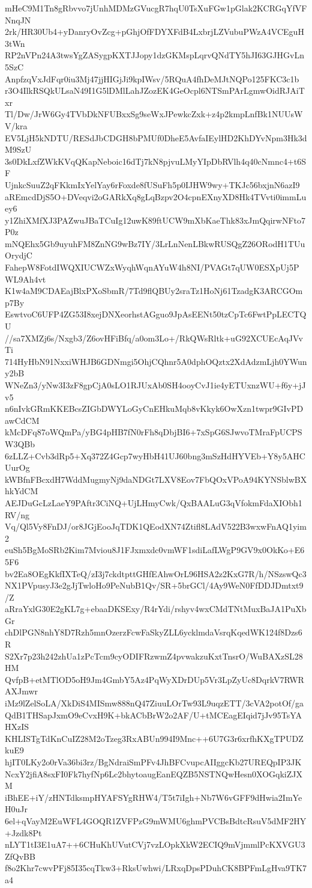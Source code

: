 mHeC9M1Tn8gRbvvo7jUnhMDMzGVucgR7hqU0TsXuFGw1pGlak2KCRGqYfVFNnqJN
2rk/HR30Ub4+yDanryOvZcg+pGhjOfFDYXFdB4LxbrjLZVubuPWzA4VCEguH3tWn
RP2nVPn24A3twsYgZASygpKXTJJopy1dzGKMspLqrvQNdTY5hJI63GJHGvLn5SzC
AnpfzqVxJdFqr0iu3Mj47jjHIGjJi9kpIWsv/5RQuA4fhDeMJtNQPo125FKC3c1b
r3O4IlkRSQkULsaN49I1G5lDMlLahJZozEK4GeOcpl6NTSmPArLgmwOidRJAiTxr
Tl/Dw/JrW6Gy4TVbDkNFUBxxSg9seWxJPewkcZxk+z4p2kmpLnfBk1NUUsWV/kra
EV5LjH5kNDTU/RESdJbCDGH8bPMUf0DheE5AvfaIEylHD2KhDYvNpm3Hk3dM9SzU
3s0DkLxfZWkKVqQKapNeboic16dTj7kN8pjvuLMyYIpDbRVlh4q40cNmnc4+t6SF
UjnkcSuuZ2qFKkmIxYelYay6rFoxde8fUSuFh5p0IJHW9wy+TKJc56bxjnN6azI9
aREmcdDjS5O+DVeqvi2oGARkXq8gLqBzpv2O4cpnEXnyXD8Hk4TVvti0immLuey6
y1ZhiXMfXJ3PAZwuJBaTCuIg12uwK89ftUCW9mXbKaeThk83xJmQqirwNFto7P0z
mNQEhx5Gb9uyuhFM8ZnNG9wBz7IY/3LrLnNenLBkwRUSQgZ26ORodH1TUuOrydjC
FahepW8FotdIWQXIUCWZxWyqhWqnAYuW4h8NI/PVAGt7qUW0ESXpUj5PWL9Ah4vt
K1w4aM9CDAEajBlxPXoSbmR/7Td9flQBUy2sraTz1HoNj61TzadgK3ARCGOmp7By
EswtvoC6UFP4ZG53I8xejDNXeorhstAGguo9JpAsEENt50tzCpTc6FwtPpLECTQU
//sa7XMZj6s/Nxgb3/Z6ovHFiBfq/a0om3Lo+/RkQWsRltk+uG92XCUEcAqJVvTi
714HyHbN91NxxiWHJB6GDNmgi5OhjCQhnr5A0dphOQztx2XdAdzmLjh0YWuny2bB
WNeZn3/yNw3I3zF8gpCjA0sLO1RJUxAb0SH4ooyCvJ1ie4yETUxnzWU+f6y+jJv5
n6nIvkGRmKKEBcsZIGbDWYLoGyCnEHkuMqb8vKkyk6OwXzn1twpr9GIvPDawCdCM
kMcDFq87oWQmPa/yBG4pHB7fN0rFh8qDbjBI6+7xSpG6SJwvoTMraFpUCPSW3QBb
6zLLZ+Cvb3dRp5+Xq372Z4Gcp7wyHbH41UJ60bng3mSzHdHYVEb+Y8y5AHCUurOg
kWBfnFBcxdH7WddMugmyNj9daNDGt7LXV8Eov7FbQOxVPoA94KYNSblwBXhkYdCM
AEJDuGcLzLaeY9PAftr3CiNQ+UjLHmyCwk/QxBAALuG3qVfokmFdaXIObh1RV/ng
Vq/Ql5Vy8FnDJ/or8JGjEooJqTDK1QEodXN74Ztifl8LAdV522B3wxwFnAQ1yim2
euSh5BgMoSRb2Kim7Mviou8J1FJxmxdc0vmWF1sdiLafLWgP9GV9x0OkKo+E65F6
bv2Ea8OEgKkfIXTeQ/zI3j7ckdtpttGHfEAhwOrL96HSA2z2KxG7R/h/NSzswQc3
NX1PVpusyJ3e2gJjTwloHo9PeNubB1Qv/SR+5brGCl/4Ay9WeN0FfDDJDmtxt9/Z
aRraYxlG30E2gKL7g+ebaaDKSExy/R4rYdi/rshyv4wxCMdTNtMuxBaJA1PuXbGr
chDlPGN8nhY8D7Rzh5mnOzerzFcwFaSkyZLL6ycklmdaVsrqKqedWK124f8Dzs6R
S2Xr7p23h242zhUa1zPcTcm9cyODIFRzwmZ4pvwakzuKxtTnsrO/WuBAXzSL28HM
QvfpB+etMTlOD5oH9Jm4GmbY5Az4PqWyXDrDUp5Vr3LpZyUc8DqrkV7RWRAXJmwr
iMz9lZelSoLA/XkDiS4MISmw888nQ47ZiuuLOrTw93L9uqzETT/3cVA2potOf/ga
QdB1THSapJxmO9eCvxH9K+bkACbBrW2o2AF/U+tMCEagEIqid7jJv95TsYAHXzIS
KHLISTgTdKnCuIZ28M2oTzeg3RxABUn994I9Mnc++6U7G3r6xrfhKXgTPUDZkuE9
hjIT0LKy2o0rVa36bi3rz/BgNdraiSmPFv4JhBFCvupcAIIggcKb27UREQpIP3JK
NcxY2jfiA8sxFI0Fk7hyfNp6Lc2bhytoaugEanEQZB5NSTNQwHesn0XOGqkiZJXM
iBhEE+iY/zHNTdksmpHYAFSYgRHW4/T5t7iIgh+Nb7W6vGFF9dHwia2ImYeH0uJr
6el+qVayM2EuWFL4GOQR1ZVFPzG9mWMU6ghmPVCBsBdtcRsuV5dMF2HY+Jzdk8Pt
nLYT1tI3E1uA7++6CHuKhUVutCVj7vzLOpkXkW2ECIQ9mVjmmlPcKXVGU3ZfQvBB
f8o2Khr7cwvPFj85I35cqTkw3+RksUwhwi/LRxqDpsPDuhCK8BPFmLgHva9TK7a4
